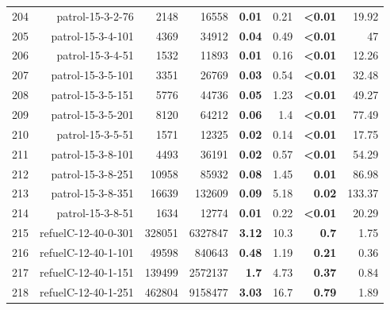 \begin{longtable}{lrr@{\hskip 12pt}r@{\hskip 12pt}r@{\hskip 12pt}r@{\hskip 12pt}r@{\hskip 12pt}r}
204 & \multirow{1}{*}{patrol-15-3-2-76} & \multirow{1}{*}{2148} & \multirow{1}{*}{16558} & \textbf{0.01} & 0.21 & \textbf{<0.01} & 19.92 \\
205 & \multirow{1}{*}{patrol-15-3-4-101} & \multirow{1}{*}{4369} & \multirow{1}{*}{34912} & \textbf{0.04} & 0.49 & \textbf{<0.01} & 47 \\
206 & \multirow{1}{*}{patrol-15-3-4-51} & \multirow{1}{*}{1532} & \multirow{1}{*}{11893} & \textbf{0.01} & 0.16 & \textbf{<0.01} & 12.26 \\
207 & \multirow{1}{*}{patrol-15-3-5-101} & \multirow{1}{*}{3351} & \multirow{1}{*}{26769} & \textbf{0.03} & 0.54 & \textbf{<0.01} & 32.48 \\
208 & \multirow{1}{*}{patrol-15-3-5-151} & \multirow{1}{*}{5776} & \multirow{1}{*}{44736} & \textbf{0.05} & 1.23 & \textbf{<0.01} & 49.27 \\
209 & \multirow{1}{*}{patrol-15-3-5-201} & \multirow{1}{*}{8120} & \multirow{1}{*}{64212} & \textbf{0.06} & 1.4 & \textbf{<0.01} & 77.49 \\
210 & \multirow{1}{*}{patrol-15-3-5-51} & \multirow{1}{*}{1571} & \multirow{1}{*}{12325} & \textbf{0.02} & 0.14 & \textbf{<0.01} & 17.75 \\
211 & \multirow{1}{*}{patrol-15-3-8-101} & \multirow{1}{*}{4493} & \multirow{1}{*}{36191} & \textbf{0.02} & 0.57 & \textbf{<0.01} & 54.29 \\
212 & \multirow{1}{*}{patrol-15-3-8-251} & \multirow{1}{*}{10958} & \multirow{1}{*}{85932} & \textbf{0.08} & 1.45 & \textbf{0.01} & 86.98 \\
213 & \multirow{1}{*}{patrol-15-3-8-351} & \multirow{1}{*}{16639} & \multirow{1}{*}{132609} & \textbf{0.09} & 5.18 & \textbf{0.02} & 133.37 \\
214 & \multirow{1}{*}{patrol-15-3-8-51} & \multirow{1}{*}{1634} & \multirow{1}{*}{12774} & \textbf{0.01} & 0.22 & \textbf{<0.01} & 20.29 \\
215 & \multirow{1}{*}{refuelC-12-40-0-301} & \multirow{1}{*}{328051} & \multirow{1}{*}{6327847} & \textbf{3.12} & 10.3 & \textbf{0.7} & 1.75 \\
216 & \multirow{1}{*}{refuelC-12-40-1-101} & \multirow{1}{*}{49598} & \multirow{1}{*}{840643} & \textbf{0.48} & 1.19 & \textbf{0.21} & 0.36 \\
217 & \multirow{1}{*}{refuelC-12-40-1-151} & \multirow{1}{*}{139499} & \multirow{1}{*}{2572137} & \textbf{1.7} & 4.73 & \textbf{0.37} & 0.84 \\
218 & \multirow{1}{*}{refuelC-12-40-1-251} & \multirow{1}{*}{462804} & \multirow{1}{*}{9158477} & \textbf{3.03} & 16.7 & \textbf{0.79} & 1.89 \\

\end{longtable}
